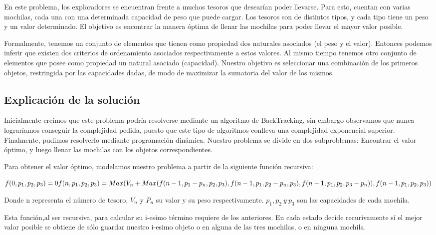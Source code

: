 \documentclass[spanish,12pt]{article}
\begin{document}
{En este problema, los exploradores se encuentran frente a muchos tesoros que desearían poder llevarse. Para esto, cuentan con varias mochilas, cada una con una determinada capacidad de peso que puede cargar.
Los tesoros son de distintos tipos, y cada tipo tiene un peso y un valor determinado.
El objetivo es encontrar la manera óptima de llenar las mochilas para poder llevar el mayor valor posible.

Formalmente, tenemos un conjunto de elementos que tienen como propiedad dos naturales asociados (el peso y el valor). Entonces podemos inferir que existen dos criterios de ordenamiento asociados respectivamente a estos valores.
Al mismo tiempo tenemos otro conjunto de elementos que posee como propiedad un natural asociado (capacidad).
Nuestro objetivo es seleccionar una combinación de los primeros objetos, restringida por las capacidades dadas, de modo de maximizar la sumatoria del valor de los mismos.


\subsection{Explicación de la solución}

   Inicialmente creímos que este problema podría resolverse mediante un algoritmo de BackTracking, sin embargo observamos que nunca lograríamos conseguir la complejidad pedida, puesto que este tipo de algoritmos conlleva una complejidad exponencial superior.
   Finalmente, pudimos resolverlo mediante programación dinámica. Nuestro problema se divide en dos subproblemas:
   Encontrar el valor óptimo, y luego llenar las mochilas con los objetos correspondientes.

   Para obtener el valor óptimo, modelamos nuestro problema a partir de la siguiente función recursiva:

	$f(0,p_{1},p_{2},p_{3})=0 \\
	f(n,p_{1},p_{2},p_{3}) = Max(V_{n}+Max(f(n-1,p_{1}-p_{n},p_{2},p_{3}), f(n-1,p_{1},p_{2}-p_{n},p_{3}), f(n-1,p_{1},p_{2},p_{3}-p_{n})),f(n-1,p_{1},p_{2},p_{3})) $

	Donde n representa el número de tesoro, $V_{n}$ y $P_{n}$ su valor y su peso respectivamente. $p_{1},p_{2}\ y \ p_{3}$ son las capacidades de cada mochila.

	Esta función,al ser recursiva, para calcular su i-esimo término requiere de los anteriores. En cada estado decide recurivamente sí el mejor valor posible se obtiene de sólo guardar nuestro i-esimo objeto o en alguna de las tres mochilas, o en ninguna mochila.



}
\end{document}
